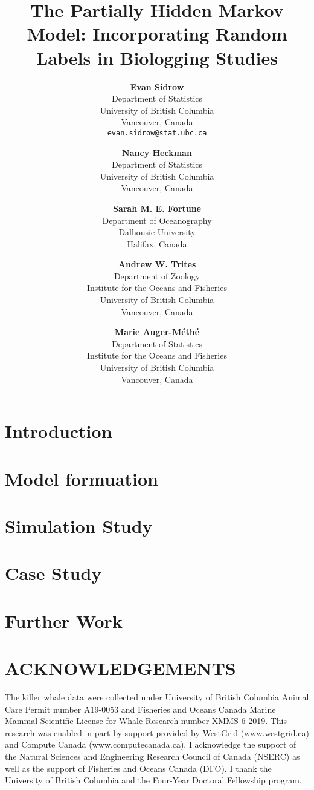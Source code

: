 \documentclass{article}
\title{The Partially Hidden Markov Model: Incorporating Random Labels in Biologging Studies}
\author{
  \textbf{Evan Sidrow} \\
  Department of Statistics \\
  University of British Columbia\\
  Vancouver, Canada \\
  \texttt{evan.sidrow@stat.ubc.ca} \\
  \and
  \textbf{Nancy Heckman} \\
  Department of Statistics \\
  University of British Columbia \\
  Vancouver, Canada \\
  \and
  \textbf{Sarah M. E. Fortune} \\
  Department of Oceanography \\
  Dalhousie University \\
  Halifax, Canada \\
  \and
  \textbf{Andrew W. Trites} \\
  Department of Zoology \\
  Institute for the Oceans and Fisheries \\
  University of British Columbia \\
  Vancouver, Canada \\
  \and
  \textbf{Marie Auger-M\'eth\'e} \\
  Department of Statistics \\
  Institute for the Oceans and Fisheries \\
  University of British Columbia \\
  Vancouver, Canada \\
}
\begin{document}
\maketitle

\section{Introduction}
\label{sec:intro}


\section{Model formuation}
\label{sec:model}


\section{Simulation Study}
\label{sec:sim}


\section{Case Study}
\label{sec:case}


\section{Further Work}
\label{sec:fut_ss}


\section*{ACKNOWLEDGEMENTS}
The killer whale data were collected under University of British Columbia Animal Care Permit number A19-0053 and Fisheries and Oceans Canada Marine Mammal Scientific License for Whale Research number XMMS 6 2019.
This research was enabled in part by support provided by WestGrid (www.westgrid.ca) and Compute Canada (www.computecanada.ca).
I acknowledge the support of the Natural Sciences and Engineering Research Council of Canada (NSERC) as well as the support of Fisheries and Oceans Canada (DFO). 
I thank the University of British Columbia and the Four-Year Doctoral Fellowship program.
%
\newpage

%

\begin{appendix}



\end{appendix}
\end{document}
